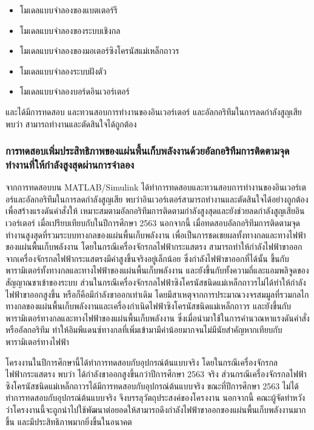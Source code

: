 \documentclass[11pt,a4paper]{article}
\begin{document}
\begin{itemize}
    \item โมเดลแบบจำลองของแบตเตอร์รี
    \item โมเดลแบบจำลองของระบบเชิงกล
    \item โมเดลแบบจำลองของมอเตอร์ซิงโครนัสแม่เหล็กถาวร
    \item โมเดลแบบจำลองระบบฝังตัว
    \item โมเดลแบบจำลองบอร์ดอินเวอร์เตอร์
\end{itemize}

และได้มีการทดสอบ และทวนสอบการทำงานของอินเวอร์เตอร์ และอัลกอริทึมในการลดกำลังสูญเสีย พบว่า สามารถทำงานและตัดสินใจได้ถูกต้อง

\subsubsection{การทดสอบเพิ่มประสิทธิภาพของแผ่นพื้นเก็บพลังงานด้วยอัลกอริทึมการติดตามจุดทำงานที่ให้กำลังสูงสุดผ่านการจำลอง}
จากการทดสอบบน MATLAB/Simulink ได้ทำการทดสอบและทวนสอบการทำงานของอินเวอร์เตอร์และอัลกอริทึมในการลดกำลังสูญเสีย พบว่าอินเวอร์เตอร์สามารถทำงานและตัดสินใจได้อย่างถูกต้อง เพื่อสร้างแรงดันคำสั่งให้ เหมาะสมตามอัลกอริทึมการติดตามกำลังสูงสุดและยังช่วยลดกำลังสูญเสียอินเวอร์เตอร์ เมื่อเปรียบเทียบกับในปีการศึกษา 2563 นอกจากนี้ เมื่อทดสอบอัลกอริทึมการติดตามจุดทำงานสูงสุดที่รวมระบบทางกลของแผ่นพื้นเก็บพลังงาน เพื่อเป็นการชดเชยผลทั้งทางกลและทางไฟฟ้าของแผ่นพื้นเก็บพลังงาน โดยในกรณีเครื่องจักรกลไฟฟ้ากระแสตรง สามารถทำให้กำลังไฟฟ้าขาออกจากเครื่องจักรกลไฟฟ้ากระแสตรงมีค่าสูงขึ้นจริงอยู่เล็กน้อย ซึ่งกำลังไฟฟ้าขาออกที่ได้นั้น ขึ้นกับพารามิเตอร์ทั้งทางกลและทางไฟฟ้าของแผ่นพื้นเก็บพลังงาน และยังขึ้นกับทั้งความถี่และแอมพลิจูดของสัญญาณขาเข้าของระบบ ส่วนในกรณีเครื่องจักรกลไฟฟ้าซิงโครนัสชนิดแม่เหล็กถาวรไม่ได้ทำให้กำลังไฟฟ้าขาออกสูงขึ้น หรือก็คือมีกำลังขาออกเท่าเดิม โดยมีสาเหตุจากการประมาณวงจรสมมูลที่รวมกลไกทางกลของแผ่นพื้นเก็บพลังงานและเครื่องกำเนิดไฟฟ้าซิงโครนัสชนิดแม่เหล็กถาวร และยังขึ้นกับพารามิเตอร์ทางกลและทางไฟฟ้าของแผ่นพื้นเก็บพลังงาน ซึ่งเมื่อนำมาใช้ในการคำนวณหาแรงดันคำสั่งหรืออัลกอริทึม ทำให้อิมพีแดนซ์ทางกลที่เพิ่มเข้ามามีค่าน้อยมากจนไม่มีนัยสำคัญหากเทียบกับพารามิเตอร์ทางไฟฟ้า

โครงงานในปีการศึกษานี้ได้ทำการทดสอบกับอุปกรณ์ต้นแบบจริง โดยในกรณีเครื่องจักรกลไฟฟ้ากระแสตรง พบว่า ได้กำลังขาออกสูงขึ้นกว่าปีการศึกษา 2563 จริง ส่วนกรณีเครื่องจักรกลไฟฟ้าซิงโครนัสชนิดแม่เหล็กถาวรได้มีการทดสอบกับอุปกรณ์ต้นแบบจริง ขณะที่ปีการศึกษา 2563 ไม่ได้ทำการทดสอบกับอุปกรณ์ต้นแบบจริง จึงบรรลุวัตถุประสงค์ของโครงงาน นอกจากนี้ คณะผู้จัดทำหวังว่าโครงงานนี้จะถูกนำไปใช้พัฒนาต่อยอดให้สามารถดึงกำลังไฟฟ้าขาออกของแผ่นพื้นเก็บพลังงานมากขึ้น และมีประสิทธิภาพมากยิ่งขึ้นในอนาคต
\end{document}
